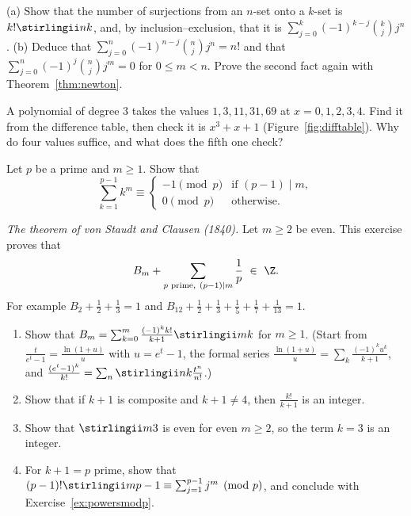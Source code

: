 \begin{exercise}[$\star$]\label{ex:surjections}
(a) Show that the number of surjections from an $n$-set onto a $k$-set is $k!\stirlingii nk$, and, by inclusion--exclusion,
that it is $\sum_{j=0}^k(-1)^{k-j}\binom kjj^n$.
(b) Deduce that $\sum_{j=0}^n(-1)^{n-j}\binom njj^n=n!$ and that $\sum_{j=0}^n(-1)^j\binom njj^m=0$ for $0\le m<n$. Prove the
second fact again with Theorem~\ref{thm:newton}.
\end{exercise}

\begin{exercise}[$\star$]\label{ex:engine}
A polynomial of degree $3$ takes the values $1,3,11,31,69$ at $x=0,1,2,3,4$. Find it from the difference table, then
check it is $x^3+x+1$ (Figure~\ref{fig:difftable}). Why do four values suffice, and what does the fifth one check?
\end{exercise}

\begin{exercise}[$\star\star$]\label{ex:powersmodp}
Let $p$ be a prime and $m\ge1$. Show that
\[
\sum_{k=1}^{p-1}k^m\equiv\begin{cases}-1\pmod p&\text{if }(p-1)\mid m,\\0\pmod p&\text{otherwise.}\end{cases}
\]
\end{exercise}

\begin{exercise}[$\star\star\star$]\label{ex:staudt}
\emph{The theorem of von Staudt and Clausen (1840).} Let $m\ge2$ be even. This exercise proves that
\[
B_m+\sum_{p\text{ prime},\ (p-1)\mid m}\frac1p\ \in\ \Z.
\]
For example $B_2+\frac12+\frac13=1$ and $B_{12}+\frac12+\frac13+\frac15+\frac17+\frac1{13}=1$.
\begin{enumerate}[label=(\alph*)]
\item Show that $B_m=\sum_{k=0}^m\frac{(-1)^kk!}{k+1}\stirlingii mk$ for $m\ge1$. (Start from
$\frac t{e^t-1}=\frac{\ln(1+u)}u$ with $u=e^t-1$, the formal series $\frac{\ln(1+u)}u=\sum_k\frac{(-1)^ku^k}{k+1}$, and
$\frac{(e^t-1)^k}{k!}=\sum_n\stirlingii nk\frac{t^n}{n!}$.)
\item Show that if $k+1$ is composite and $k+1\ne4$, then $\frac{k!}{k+1}$ is an integer.
\item Show that $\stirlingii m3$ is even for even $m\ge2$, so the term $k=3$ is an integer.
\item For $k+1=p$ prime, show that $(p-1)!\stirlingii m{p-1}\equiv\sum_{j=1}^{p-1}j^m\pmod p$, and conclude with
Exercise~\ref{ex:powersmodp}.
\end{enumerate}
\end{exercise}

